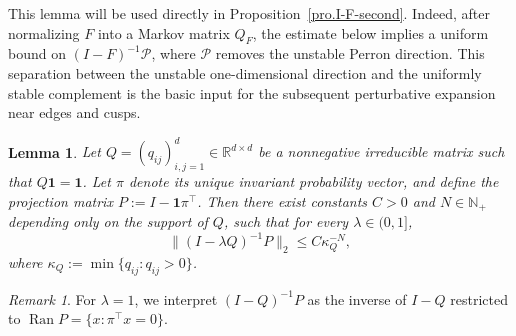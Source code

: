 \documentclass[11pt,twoside, a4paper]{article}
\numberwithin{equation}{section}
\numberwithin{figure}{section}
\theoremstyle{plain} %
\newtheorem{lemma}[theorem]{Lemma}
\theoremstyle{definition}
\theoremstyle{remark}
\newtheorem{remark}[theorem]{Remark}
\newcommand{\1} {\mspace{1 mu}}
\newcommand{\2} {\mspace{2 mu}}
\newcommand{\R} {\mathbb{R}}
\newcommand{\N} {{\mathbb{N}}}
\DeclareMathOperator{\Ran}{Ran}
\begin{document}
This lemma will be used directly in Proposition~\ref{pro.I-F-second}. Indeed,
after normalizing \(F\) into a Markov matrix \(Q_F\), the estimate below implies
a uniform bound on \((I-F)^{-1}\mathcal P\), where \(\mathcal P\) removes the
unstable Perron direction. This separation between the unstable
one-dimensional direction and the uniformly stable complement is the basic input
for the subsequent perturbative expansion near edges and cusps.

\begin{lemma}\label{lem:Q-second-singular-gap-lambda}
Let \(Q=(q_{ij})_{i,j=1}^d\in \R^{d\times d}\) be a nonnegative irreducible matrix such that $Q\mathbf 1=\mathbf 1$. Let $\pi$ denote its unique invariant probability vector, and define
the projection matrix $P:=I-\mathbf{1}\pi^\top$.
Then there exist constants \(C>0\) and $N\in\N_+$ depending only on the support of $Q$, such that for every \(\lambda\in(0,1]\),
\begin{equation}
      \|(I-\lambda Q)^{-1}P\|_2\le C\kappa_Q^{-N},
\end{equation}
where $\kappa_Q:=\min\{q_{ij}:q_{ij}>0\}$.
\end{lemma}

\begin{remark}
  For \(\lambda=1\), we interpret \((I-Q)^{-1}P\) as the inverse of \(I-Q\) restricted to \(\Ran P=\{x:\pi^\top x=0\}\).
\end{remark}
\end{document}
